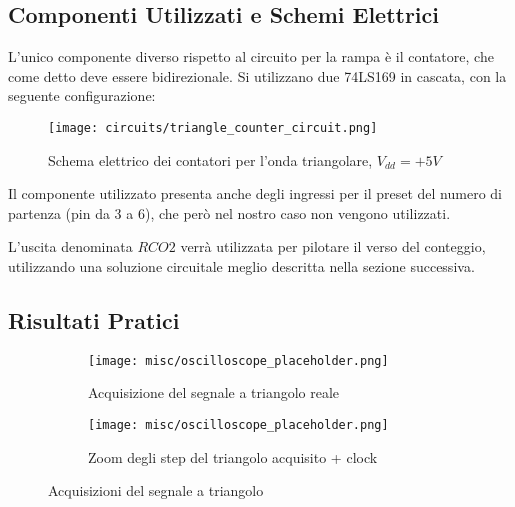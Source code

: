 \subsection*{Componenti Utilizzati e Schemi Elettrici}

L'unico componente diverso rispetto al circuito per la rampa è il contatore, che come detto
deve essere bidirezionale. Si utilizzano due 74LS169 \cite{74ls169} in cascata, con la seguente
configurazione:
\medskip

\begin{figure}[ht]
    \centering
    \texttt{[image: circuits/triangle\_counter\_circuit.png]}
    \caption{Schema elettrico dei contatori per l'onda triangolare, $V_{dd}=+5V$}
    \label{triangle_counter_circuit}
\end{figure}

Il componente utilizzato presenta anche degli ingressi per il preset del numero di partenza
(pin da 3 a 6), che però nel nostro caso non vengono utilizzati.

L'uscita denominata $RCO2$ verrà utilizzata per pilotare il verso del conteggio, utilizzando
una soluzione circuitale meglio descritta nella sezione successiva.


\subsection*{Risultati Pratici}

\begin{figure}[ht]
    \centering

    \begin{subfigure}{.5\textwidth}
        \centering
        \texttt{[image: misc/oscilloscope\_placeholder.png]}
        \caption{Acquisizione del segnale a triangolo reale}
        \label{acq_triangle}
    \end{subfigure}%
    \begin{subfigure}{.5\textwidth}
        \centering
        \texttt{[image: misc/oscilloscope\_placeholder.png]}
        \caption{Zoom degli step del triangolo acquisito + clock}
        \label{acq_triangle_steps}
    \end{subfigure}

    \caption{Acquisizioni del segnale a triangolo}
    \label{acq_triangle_signals}
\end{figure}


